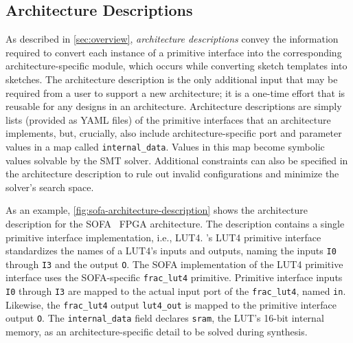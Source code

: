 \subsection{Architecture Descriptions}
\label{sec:impl-arch-descs}



\noindent As described in \cref{sec:overview},
  \textit{architecture descriptions}
  convey the information
  required to convert
  each instance of a primitive interface
  into the corresponding
  architecture-specific module,
  which occurs while converting
  sketch templates
  into sketches.
The architecture description is
  the only additional input that
  may be required from a user
  to support a new architecture;
  it is a one-time effort 
  that is reusable
  for any designs in an architecture.
Architecture descriptions
  are simply lists
  (provided as YAML files)
  of the primitive interfaces
  that an architecture implements,
  but, crucially,
  also include 
  architecture-specific
  port and parameter values
  in a map called \texttt{internal\_data}.
Values in this map
  become symbolic values
  solvable by the SMT solver.
Additional constraints can also be specified
  in the architecture description 
  to rule out invalid configurations
  and minimize the solver's search space.\tighten

As an example,
  \cref{fig:sofa-architecture-description}
  shows the architecture description
  for the SOFA~\cite{sofa}
  FPGA architecture.
The description contains
  a single primitive interface implementation, i.e., 
  LUT4.
\lr's LUT4 primitive interface
  standardizes the names of a LUT4's inputs and outputs,
  naming the inputs
  \texttt{I0} through \texttt{I3}
  and the output
  \texttt{O}.
The SOFA implementation 
  of the LUT4 primitive interface
  uses
  the SOFA-specific
  \texttt{frac\_lut4}
  primitive.
Primitive interface inputs \texttt{I0} through \texttt{I3}
  are mapped to
  the actual
  input port of the \texttt{frac\_lut4},
  named \texttt{in}.
Likewise, the \texttt{frac\_lut4} output
  \texttt{lut4\_out}
  is mapped to the primitive interface output \texttt{O}.
The \texttt{internal_data} field
  declares \texttt{sram},
  the LUT's 16-bit internal memory,
  as an architecture-specific detail
  to be solved during synthesis.
 
